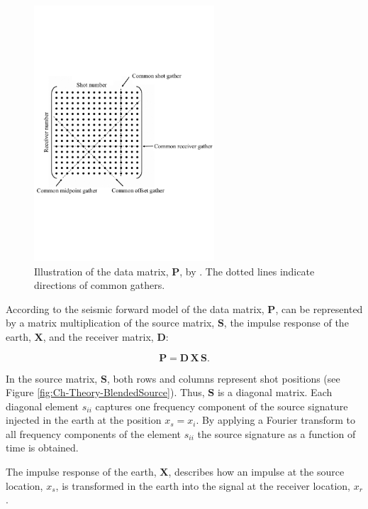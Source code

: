 \begin{figure}
    \centering
	\includegraphics[width = 0.6\textwidth]{Plots/Mahdad-Data-Matrix-edited}
	\caption{Illustration of the data matrix, $\mathbf{P}$, by \cite{Mahdad-Deblending-Method}. The dotted lines indicate directions of common gathers.}
	\label{fig:Ch-Theory-DataMatrixMahdad}
\end{figure}

According to the seismic forward model of \citet{Berkhout1982} the data matrix, $\mathbf{P}$, can be represented by a matrix multiplication of the source matrix, $\mathbf{S}$, the impulse response of the earth, $\mathbf{X}$, and the receiver matrix, $\mathbf{D}$:

\begin{equation}
	\mathbf{P} = \mathbf{D \, X \, S}.
	\label{eq:Ch-Theory-DataRepresentation}
\end{equation}

In the source matrix, $\mathbf{S}$, both rows and columns represent shot positions (see Figure \ref{fig:Ch-Theory-BlendedSource}). Thus, $\mathbf{S}$ is a diagonal matrix. Each diagonal element $s_{ii}$ captures one frequency component of the source signature injected in the earth at the position $x_s = x_i$. By applying a Fourier transform to all frequency components of the element $s_{ii}$ the source signature as a function of time is obtained.

The impulse response of the earth, $\mathbf{X}$, describes how an impulse at the source location, $x_s$, is transformed in the earth into the signal at the receiver location, $x_r$.

